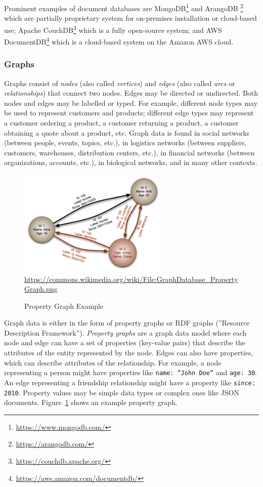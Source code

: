 Prominent examples of document databases are MongoDB\footnote{\url{https://www.mongodb.com/}} and ArangoDB \footnote{\url{https://arangodb.com/}} which are partially proprietary system for on-premises installation or cloud-based use; Apache CouchDB\footnote{\url{https://couchdb.apache.org/}} which is a fully open-source system; and AWS DocumentDB\footnote{\url{https://aws.amazon.com/documentdb/}} which is a cloud-based system on the Amazon AWS cloud. 

\subsubsection*{Graphs}

Graphs consist of \emph{nodes} (also called \emph{vertices}) and \emph{edges} (also called \emph{arcs} or \emph{relationships}) that connect two nodes. Edges may be directed or undirected. Both nodes and edges may be labelled or typed. For example, different node types may be used to represent customers and products; different edge types may represent a customer ordering a product, a customer returning a product, a customer obtaining a quote about a product, etc. Graph data is found in social networks (between people, events, topics, etc.), in logistics networks (between suppliers, customers, warehouses, distribution centers, etc.), in financial networks (between organizations, accounts, etc.), in biological networks, and in many other contexts.

\begin{figure}[h]
\centering
\includegraphics[height=2in]{GraphDatabase_PropertyGraph.png}
\scriptsize{\url{https://commons.wikimedia.org/wiki/File:GraphDatabase_PropertyGraph.png}}
\caption{Property Graph Example}
\label{fig:propertygraph}
\end{figure}

Graph data is either in the form of property graphs or RDF graphs (''Resource Description Framework''). \emph{Property graphs} are a graph data model where each node and edge can have a set of properties (key-value pairs) that describe the attributes of the entity represented by the node. Edges can also have properties, which can describe attributes of the relationship. For example, a node representing a person might have properties like \texttt{name: ''John Doe''} and \texttt{age: 30}. An edge representing a friendship relationship might have a property like \texttt{since: 2010}. Property values may be simple data types or complex ones like JSON documents. Figure~\ref{fig:propertygraph} shows an example property graph. 
    
